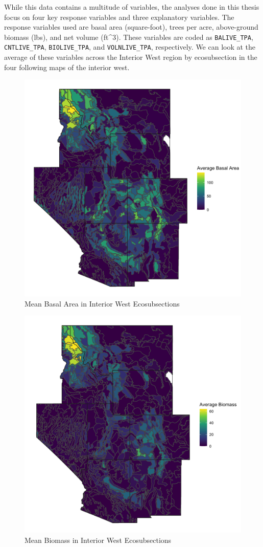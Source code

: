 \documentclass[12pt,twoside]{reedthesis}
\begin{document}
While this data contains a multitude of variables, the analyses done in this thesis focus on four key response variables and three explanatory variables. The response variables used are basal area (square-foot), trees per acre, above-ground biomass (lbs), and net volume (ft\^{}3). These variables are coded as \texttt{BALIVE\_TPA}, \texttt{CNTLIVE\_TPA}, \texttt{BIOLIVE\_TPA}, and \texttt{VOLNLIVE\_TPA}, respectively. We can look at the average of these variables across the Interior West region by ecosubsection in the four following maps of the interior west.
\begin{figure}

{\centering \includegraphics[width=0.65\linewidth]{figure/basal} 

}

\caption{Mean Basal Area in Interior West Ecosubsections}\label{fig:unnamed-chunk-6}
\end{figure}
\begin{figure}

{\centering \includegraphics[width=0.65\linewidth]{figure/biomass} 

}

\caption{Mean Biomass in Interior West Ecosubsections}\label{fig:unnamed-chunk-7}
\end{figure}
\end{document}
